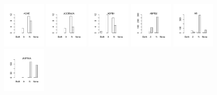 \documentclass[utf8]{frontiersSCNS} %
\begin{document}
\begin{figure}[h!]
\vspace*{-15pt} %
\includegraphics[width=0.19\textwidth]{figures/validation_plots/ache_0p8_valplot.pdf}
\includegraphics[width=0.19\textwidth]{figures/validation_plots/adora2a_0p8_valplot.pdf}
\includegraphics[width=0.19\textwidth]{figures/validation_plots/adrb1_0p8_valplot.pdf}
\includegraphics[width=0.19\textwidth]{figures/validation_plots/adrb2_0p8_valplot.pdf}
\includegraphics[width=0.19\textwidth]{figures/validation_plots/ar_0p8_valplot.pdf}
\vspace*{-15pt} %
\includegraphics[width=0.19\textwidth]{figures/validation_plots/avpr1a_0p8_valplot.pdf}

\end{figure}
\end{document}
